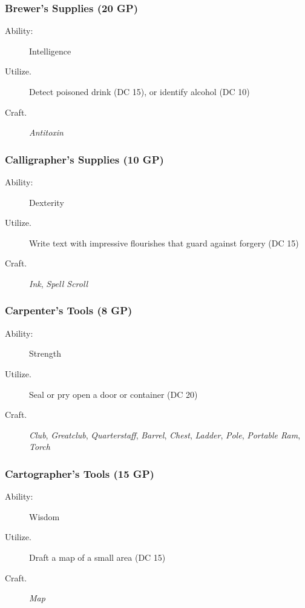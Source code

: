 \documentclass[10pt,a4paper,twoside,bg=print,twocolumn,openany,nodeprecatedcode]{dndbook}
\begin{document}
\subsubsection{Brewer's Supplies (20 GP)}

\begin{description}
\item[Ability:]
Intelligence
\item[Utilize.]
Detect poisoned drink (DC 15), or identify alcohol (DC 10)
\item[Craft.]
\textit{Antitoxin}
\end{description}

\subsubsection{Calligrapher's Supplies (10 GP)}

\begin{description}
\item[Ability:]
Dexterity
\item[Utilize.]
Write text with impressive flourishes that guard against forgery (DC 15)
\item[Craft.]
\textit{Ink}, \textit{Spell Scroll}
\end{description}

\subsubsection{Carpenter's Tools (8 GP)}

\begin{description}
\item[Ability:]
Strength
\item[Utilize.]
Seal or pry open a door or container (DC 20)
\item[Craft.]
\textit{Club}, \textit{Greatclub}, \textit{Quarterstaff}, \textit{Barrel}, \textit{Chest}, \textit{Ladder}, \textit{Pole}, \textit{Portable Ram}, \textit{Torch}
\end{description}

\subsubsection{Cartographer's Tools (15 GP)}

\begin{description}
\item[Ability:]
Wisdom
\item[Utilize.]
Draft a map of a small area (DC 15)
\item[Craft.]
\textit{Map}
\end{description}
\end{document}
